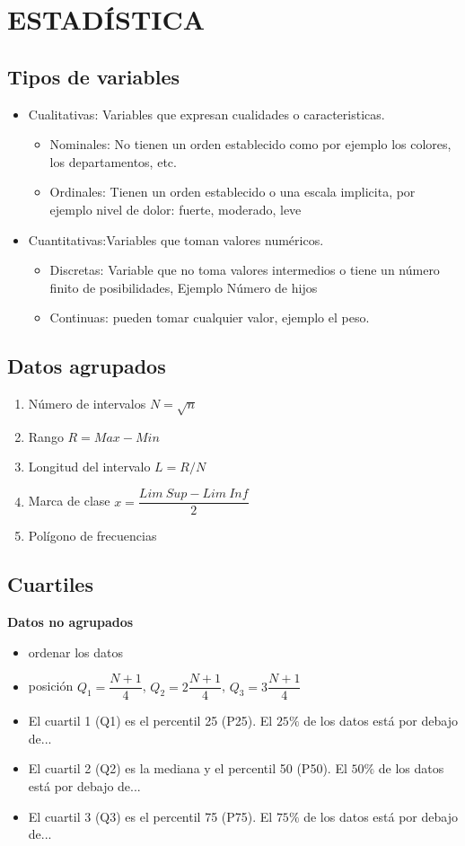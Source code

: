 \section{ESTADÍSTICA}

\subsection{Tipos de variables}

\begin{itemize}
	\item Cualitativas: Variables que expresan cualidades o caracteristicas.
	\begin{itemize}
		\item Nominales: No tienen un orden establecido como por ejemplo los colores, los departamentos, etc.
		\item Ordinales: Tienen un orden establecido o una escala implicita, por ejemplo nivel de dolor: fuerte, moderado, leve
	\end{itemize}
	\item Cuantitativas:Variables que toman valores numéricos.
	\begin{itemize}
		\item Discretas: Variable que no toma valores intermedios o tiene un número finito de posibilidades, Ejemplo Número de hijos
		\item Continuas: pueden tomar cualquier valor, ejemplo el peso.
	\end{itemize}
\end{itemize}

\subsection{Datos agrupados}
\begin{enumerate}
	\item Número de intervalos $N=\sqrt{n}$
	\item Rango $R=Max- Min$
	\item Longitud del intervalo $L=R/N$
	\item Marca de clase $x=\dfrac{Lim\ Sup-Lim\ Inf}{2}$
	\item Polígono de frecuencias
\end{enumerate}



\subsection{Cuartiles}
\textbf{Datos no agrupados}
\begin{itemize}
	\item ordenar los datos
	\item posición $Q_1=\dfrac{N+1}{4}$, $Q_2=2\dfrac{N+1}{4}$, $Q_3=3\dfrac{N+1}{4}$
	\item El cuartil 1 (Q1) es el percentil 25 (P25). El $25\%$ de los datos está por debajo de...
	\item El cuartil 2 (Q2) es la mediana y el percentil 50 (P50). El $50\%$ de los datos está por debajo de...
	\item El cuartil 3 (Q3) es el percentil 75 (P75). El $75\%$ de los datos está por debajo de...
\end{itemize}

